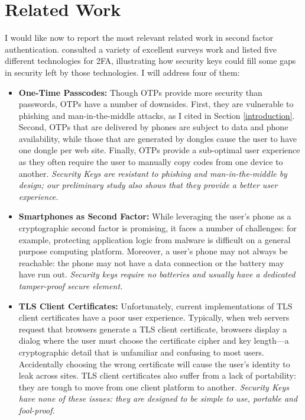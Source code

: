 \section{Related Work}
I would like now to report the most relevant related work in second factor authentication. \citet{lang2016security} consulted a variety of excellent surveys work \cite{bonneau2012quest,herley2009passwords,biddle2012graphical,jain2007handbook} and listed five different technologies for 2FA, illustrating how security keys could fill some gaps in security left by those technologies. I will address four of them:
\begin{itemize}
    \item \textbf{One-Time Passcodes:} Though OTPs provide more security than passwords, OTPs have a number of downsides. First, they are vulnerable to phishing and man-in-the-middle attacks, as I cited in Section \ref{introduction}. Second, OTPs that are delivered by phones are subject to data and phone availability, while those that are generated by dongles cause the user to have one dongle per web site. Finally, OTPs provide a sub-optimal user experience as they often require the user to manually copy codes from one device to another. \emph{Security Keys are resistant to phishing and man-in-the-middle by design; our preliminary study also shows that they provide a better user experience.}
    \item \textbf{Smartphones as Second Factor:} While leveraging the user’s phone as a cryptographic second factor is promising, it faces a number of challenges: for example, protecting application logic from malware is difficult on a general purpose computing platform. Moreover, a user’s phone may not always be reachable: the phone may not have a data connection or the battery may have run out. \emph{Security keys require no batteries and usually have a dedicated
    tamper-proof secure element.}
    \item \textbf{TLS Client Certificates:} Unfortunately, current implementations of TLS client certificates have a poor user experience. Typically, when web servers request that browsers generate a TLS client certificate, browsers display a dialog where the user must choose the certificate cipher and key length—a cryptographic detail that is unfamiliar and confusing to most users. Accidentally choosing the wrong certificate will cause the user’s identity to leak across sites. TLS client certificates also suffer from a lack of portability: they are tough to move from one client platform to another. \emph{Security Keys have none of these issues: they are designed to be simple to use, portable and fool-proof.}

\end{itemize}
